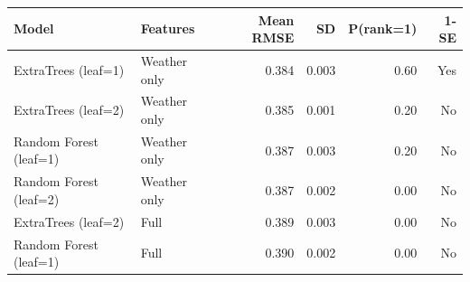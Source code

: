 \begin{tabular}{llrrrr}
\toprule
Model & Features & Mean RMSE & SD & P(rank=1) & 1-SE \\
\midrule
ExtraTrees (leaf=1) & Weather only & 0.384 & 0.003 & 0.60 & Yes \\
ExtraTrees (leaf=2) & Weather only & 0.385 & 0.001 & 0.20 & No \\
Random Forest (leaf=1) & Weather only & 0.387 & 0.003 & 0.20 & No \\
Random Forest (leaf=2) & Weather only & 0.387 & 0.002 & 0.00 & No \\
ExtraTrees (leaf=2) & Full & 0.389 & 0.003 & 0.00 & No \\
Random Forest (leaf=1) & Full & 0.390 & 0.002 & 0.00 & No \\
\bottomrule
\end{tabular}
